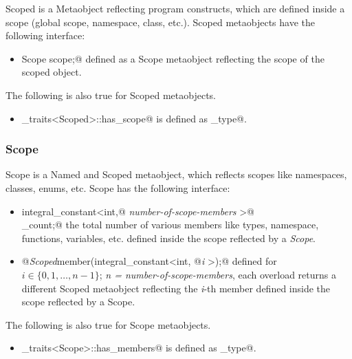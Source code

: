 {\metaobject Scoped} is a {\metaobject Metaobject} reflecting program constructs,
which are defined inside a scope (global scope, namespace, class, etc.). {\metaobject Scoped}
metaobjects have the following interface:

\begin{itemize}
	\item{\verb@typedef Scope scope;@} defined as a {\metaobject Scope} metaobject
	reflecting the scope of the scoped object.
\end{itemize}

The following is also true for {\metaobject Scoped} metaobjects.

\begin{itemize}
	\item \verb@metaobject_traits<Scoped>::has_scope@ is defined as \verb@true_type@.
\end{itemize}

\subsubsection{Scope}

{\metaobject Scope} is a {\metaobject Named} and {\metaobject Scoped} metaobject,
which reflects scopes like namespaces, classes, enums, etc. {\metaobject Scope}
has the following interface:

\begin{itemize}

	\item{\verb@typedef integral_constant<int,@ {\em number-of-scope-members}
	\verb@>@\\\verb@member_count;@} the total number of various members like types,
	namespace, functions, variables, etc. defined inside
	the scope reflected by a {\em Scope}.

	\item{\verb@static @{\em Scoped}\verb@ member(integral_constant<int, @{\em i}
	\verb@>);@} defined for $i \in \{0, 1, \dots, n-1\}$; {\em n = number-of-scope-members},
	each overload returns a different {\metaobject Scoped} metaobject reflecting the {\em i}-th member
	defined inside the scope reflected by a {\metaobject Scope}.
\end{itemize}

The following is also true for {\metaobject Scope} metaobjects.

\begin{itemize}
	\item \verb@metaobject_traits<Scope>::has_members@ is defined as \verb@true_type@.
\end{itemize}

